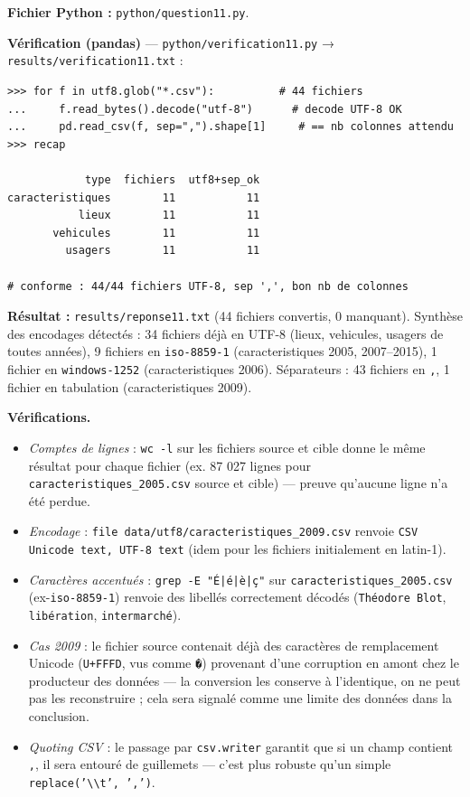 \documentclass[11pt,a4paper]{article}
\newcommand{\rub}[2]{\textbf{\textcolor{#1}{#2}}}
\begin{document}
\rub{labfichier}{Fichier Python :} \texttt{python/question11.py}.

\rub{labverif}{Vérification (pandas)} --- \texttt{python/verification11.py} → \texttt{results/verification11.txt} :

\begin{lstlisting}[style=pyblock]
>>> for f in utf8.glob("*.csv"):          # 44 fichiers
...     f.read_bytes().decode("utf-8")      # decode UTF-8 OK
...     pd.read_csv(f, sep=",").shape[1]     # == nb colonnes attendu
>>> recap

            type  fichiers  utf8+sep_ok
caracteristiques        11           11
           lieux        11           11
       vehicules        11           11
         usagers        11           11

# conforme : 44/44 fichiers UTF-8, sep ',', bon nb de colonnes
\end{lstlisting}

\rub{labresultat}{Résultat :} \texttt{results/reponse11.txt} (44 fichiers convertis, 0 manquant). Synthèse des encodages détectés : 34 fichiers déjà en UTF-8 (lieux, vehicules, usagers de toutes années), 9 fichiers en \texttt{iso-8859-1} (caracteristiques 2005, 2007–2015), 1 fichier en \texttt{windows-1252} (caracteristiques 2006). Séparateurs : 43 fichiers en \texttt{,}, 1 fichier en tabulation (caracteristiques 2009).

\rub{labanalyse}{Vérifications.}

\begin{itemize}
\item \emph{Comptes de lignes} : \texttt{wc -l} sur les fichiers source et cible donne le même résultat pour chaque fichier (ex. 87 027 lignes pour \texttt{caracteristiques\_2005.csv} source et cible) — preuve qu'aucune ligne n'a été perdue.
\item \emph{Encodage} : \texttt{file data/utf8/caracteristiques\_2009.csv} renvoie \texttt{CSV Unicode text, UTF-8 text} (idem pour les fichiers initialement en latin-1).
\item \emph{Caractères accentués} : \texttt{grep -E "É|é|è|ç"} sur \texttt{caracteristiques\_2005.csv} (ex-\texttt{iso-8859-1}) renvoie des libellés correctement décodés (\texttt{Théodore Blot}, \texttt{libération}, \texttt{intermarché}).
\item \emph{Cas 2009} : le fichier source contenait déjà des caractères de remplacement Unicode (\texttt{U+FFFD}, vus comme \texttt{�}) provenant d'une corruption en amont chez le producteur des données — la conversion les conserve à l'identique, on ne peut pas les reconstruire ; cela sera signalé comme une limite des données dans la conclusion.
\item \emph{Quoting CSV} : le passage par \texttt{csv.writer} garantit que si un champ contient \texttt{,}, il sera entouré de guillemets — c'est plus robuste qu'un simple \texttt{replace('\textbackslash{}\textbackslash{}t', ',')}.
\end{itemize}
\end{document}
